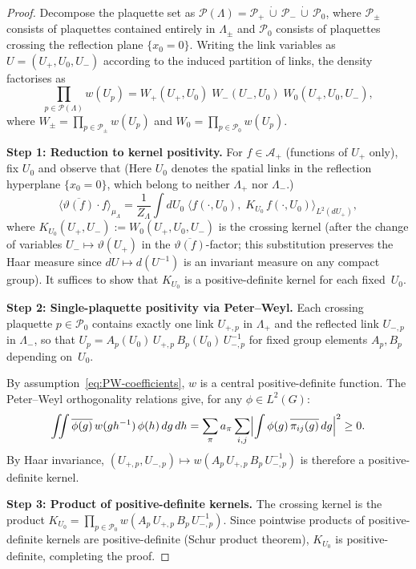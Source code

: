 \documentclass[12pt,a4paper]{article}
\theoremstyle{definition}
\theoremstyle{plain}
\theoremstyle{remark}
\begin{document}
\begin{proof}
Decompose the plaquette set as $\mathcal{P}(\Lambda) = \mathcal{P}_+ \,\dot\cup\, \mathcal{P}_- \,\dot\cup\, \mathcal{P}_0$, where $\mathcal{P}_\pm$ consists of plaquettes contained entirely in $\Lambda_\pm$ and $\mathcal{P}_0$ consists of plaquettes crossing the reflection plane $\{x_0 = 0\}$. Writing the link variables as $U = (U_+, U_0, U_-)$ according to the induced partition of links, the density factorises as
\[
    \prod_{p \in \mathcal{P}(\Lambda)} w(U_p)
    = W_+(U_+, U_0)\;W_-(U_-, U_0)\;W_0(U_+, U_0, U_-),
\]
where $W_\pm = \prod_{p \in \mathcal{P}_\pm} w(U_p)$ and $W_0 = \prod_{p \in \mathcal{P}_0} w(U_p)$.

\medskip
\noindent\textbf{Step 1: Reduction to kernel positivity.}
For $f \in \mathcal{A}_+$ (functions of $U_+$ only), fix $U_0$ and observe that (Here $U_0$ denotes the spatial links in the reflection hyperplane $\{x_0 = 0\}$, which belong to neither $\Lambda_+$ nor $\Lambda_-$.)
\[
    \langle \overline{\vartheta(f)} \cdot f \rangle_{\mu_\Lambda}
    = \frac{1}{Z_\Lambda} \int dU_0\;\bigl\langle f(\cdot, U_0),\; K_{U_0}\, f(\cdot, U_0) \bigr\rangle_{L^2(dU_+)},
\]
where $K_{U_0}(U_+, U_-) := W_0(U_+, U_0, U_-)$ is the crossing kernel (after the change of variables $U_- \mapsto \vartheta(U_+)$ in the $\overline{\vartheta(f)}$-factor; this substitution preserves the Haar measure since $dU \mapsto d(U^{-1})$ is an invariant measure on any compact group). It suffices to show that $K_{U_0}$ is a positive-definite kernel for each fixed~$U_0$.

\medskip
\noindent\textbf{Step 2: Single-plaquette positivity via Peter--Weyl.}
Each crossing plaquette $p \in \mathcal{P}_0$ contains exactly one link $U_{+,p}$ in $\Lambda_+$ and the reflected link $U_{-,p}$ in $\Lambda_-$, so that $U_p = A_p(U_0)\,U_{+,p}\,B_p(U_0)\,U_{-,p}^{-1}$ for fixed group elements $A_p, B_p$ depending on~$U_0$.

By assumption~\eqref{eq:PW-coefficients}, $w$ is a central positive-definite function. The Peter--Weyl orthogonality relations give, for any $\phi \in L^2(G)$:
\[
    \iint \overline{\phi(g)}\,w(g h^{-1})\,\phi(h)\,dg\,dh
    = \sum_{\pi} a_\pi \sum_{i,j} \Bigl|\int \phi(g)\,\overline{\pi_{ij}(g)}\,dg\Bigr|^2 \geq 0.
\]
By Haar invariance, $(U_{+,p}, U_{-,p}) \mapsto w(A_p\,U_{+,p}\,B_p\,U_{-,p}^{-1})$ is therefore a positive-definite kernel.

\medskip
\noindent\textbf{Step 3: Product of positive-definite kernels.}
The crossing kernel is the product $K_{U_0} = \prod_{p \in \mathcal{P}_0} w(A_p\,U_{+,p}\,B_p\,U_{-,p}^{-1})$. Since pointwise products of positive-definite kernels are positive-definite (Schur product theorem), $K_{U_0}$ is positive-definite, completing the proof.
\end{proof}
\end{document}
